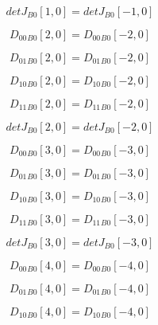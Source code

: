 \documentclass{article}
\begin{document}
\begin{dmath}{detJ{_{B0}}}[{1,0}] = {detJ{_{B0}}}[{-1,0}]\end{dmath}

\begin{dmath}{D_{00}{_{B0}}}[{2,0}] = {D_{00}{_{B0}}}[{-2,0}]\end{dmath}

\begin{dmath}{D_{01}{_{B0}}}[{2,0}] = {D_{01}{_{B0}}}[{-2,0}]\end{dmath}

\begin{dmath}{D_{10}{_{B0}}}[{2,0}] = {D_{10}{_{B0}}}[{-2,0}]\end{dmath}

\begin{dmath}{D_{11}{_{B0}}}[{2,0}] = {D_{11}{_{B0}}}[{-2,0}]\end{dmath}

\begin{dmath}{detJ{_{B0}}}[{2,0}] = {detJ{_{B0}}}[{-2,0}]\end{dmath}

\begin{dmath}{D_{00}{_{B0}}}[{3,0}] = {D_{00}{_{B0}}}[{-3,0}]\end{dmath}

\begin{dmath}{D_{01}{_{B0}}}[{3,0}] = {D_{01}{_{B0}}}[{-3,0}]\end{dmath}

\begin{dmath}{D_{10}{_{B0}}}[{3,0}] = {D_{10}{_{B0}}}[{-3,0}]\end{dmath}

\begin{dmath}{D_{11}{_{B0}}}[{3,0}] = {D_{11}{_{B0}}}[{-3,0}]\end{dmath}

\begin{dmath}{detJ{_{B0}}}[{3,0}] = {detJ{_{B0}}}[{-3,0}]\end{dmath}

\begin{dmath}{D_{00}{_{B0}}}[{4,0}] = {D_{00}{_{B0}}}[{-4,0}]\end{dmath}

\begin{dmath}{D_{01}{_{B0}}}[{4,0}] = {D_{01}{_{B0}}}[{-4,0}]\end{dmath}

\begin{dmath}{D_{10}{_{B0}}}[{4,0}] = {D_{10}{_{B0}}}[{-4,0}]\end{dmath}
\end{document}
